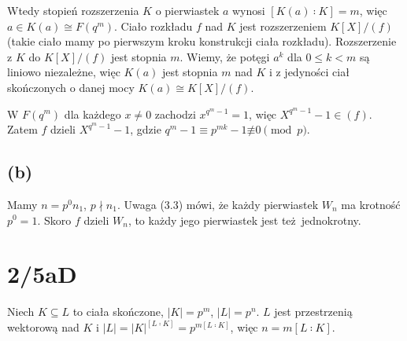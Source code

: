 \documentclass[a4paper, 12pt]{article}
\newcommand{\modulus}[1]{\left| #1 \right|}
\newcommand{\abs}{\modulus}
\newcommand{\+}{\enspace}
\begin{document}
Wtedy stopień rozszerzenia $K$ o pierwiastek $a$ wynosi
$[K(a) ∶ K] = m$, więc $a ∈ K(a) ≅ F(q^m)$.
Ciało rozkładu $f$ nad $K$ jest rozszerzeniem $K[X]/(f)$
(takie ciało mamy po pierwszym kroku konstrukcji ciała rozkładu).
Rozszerzenie z $K$ do $K[X]/(f)$ jest stopnia $m$.
Wiemy, %
że potęgi $a^k$ dla $0 ≤ k < m$ są liniowo niezależne,
więc $K(a)$ jest stopnia $m$ nad $K$
i z jedyności ciał skończonych o danej mocy $K(a) ≅ K[X]/(f)$.

W $F(q^m)$ dla każdego $x≠0$ zachodzi $x^{q^m-1} = 1$,
więc $X^{q^m-1} - 1 ∈ (f)$.
Zatem $f$ dzieli $X^{q^m-1} -1$, gdzie $q^m-1 ≡ p^{mk}-1 \not≡ 0 \pmod{p}$.

\iffalse
Niech $f ∈ K[X]$ to wielomian nierozkładalny i
$L$ to jego ciało rozkładu nad $K$.

Konstrukcja ciała rozkładu $L$ polega na rozszerzaniu ciała
$K(a_1, …, a_{i-1})$ o pierwiastek $a_i$ czynnika nierozkładalnego $f$,
więc wiemy w szczególności, że
$$[K(a_1, …, a_{i-1})(a_i) ∶ K(a_1, …, a_{i-1})] < ∞.$$
Zatem stopień rozszerzenia
$$[L∶K] = [K(a_1, …, a_{r-1})(a_r) ∶ K(a_1, …, a_{r-1})]…[K(a_1) ∶ K]$$
jest skończony i ciało $L$ jest skończone.

Skoro $f = c(X-a_1)…(X-a_r)$ jest nierozkładalny w $K[X]$, to pierwiastki $a_i$ są
niezerowe.
W skończonym ciele $L$ oznacza to, że są one pierwiastkami z jedynki.
Żaden z nich nie może mieć najmniejszej krotności $kp$ ($p \nmid k$), bo
jeśli $0 = x^{kp} - 1 = (x^k-1)^p$, to $x$ ma krotność $k<p$.

Niech $n$ to NWW pierwotnych krotności pierwiastków z jedynki $a_i$,
ta liczba jest niepodzielna przez $p$.
Każdy pierwiastek $f$ jest pierwiastkiem $W_n$, więc $f$ dzieli $W_n$.
\fi

\subsection*{(b)}
Mamy $n=p^0 n_1$, $p \nmid n_1$.
Uwaga (3.3) mówi, że każdy pierwiastek $W_n$ ma krotność $p^0 =1$.
Skoro $f$ dzieli $W_n$, to każdy jego pierwiastek jest też jednokrotny.

\section*{2/5aD}
Niech $K ⊆ L$ to ciała skończone, $\abs{K} = p^m$, $\abs{L} = p^n$.
$L$ jest przestrzenią wektorową nad $K$ i
$\abs{L} =\abs{K}^{[L ∶ K]} = p^{m[L ∶ K]}$,
więc $n = m[L ∶ K]$.
\end{document}
